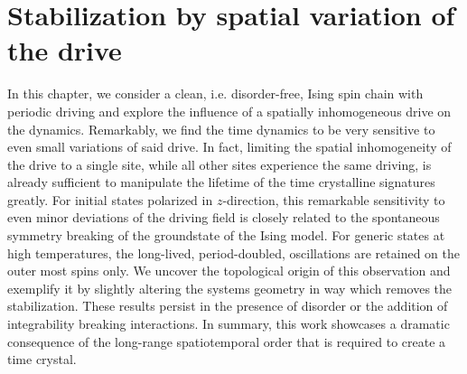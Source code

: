 \chapter{Stabilization by spatial variation of the drive}\label{ch:metronome-spin}

In this chapter, we consider a clean, i.e. disorder-free, Ising spin chain with periodic driving and explore the influence of a spatially inhomogeneous drive on the dynamics. Remarkably, we find the time dynamics to be very sensitive to even small variations of said drive. In fact, limiting the spatial inhomogeneity of the drive to a single site, while all other sites experience the same driving, is already sufficient to manipulate the lifetime of the time crystalline signatures greatly. For initial states polarized in $z$-direction, this remarkable sensitivity to even minor deviations of the driving field is closely related to the spontaneous symmetry breaking of the groundstate of the Ising model.
For generic states at high temperatures, the long-lived, period-doubled, oscillations are retained on the outer most spins only. We uncover the topological origin of this observation and exemplify it by slightly altering the systems geometry in way which removes the stabilization. 
These results persist in the presence of disorder or the addition of integrability breaking interactions. In summary, this work showcases a dramatic consequence of the long-range spatiotemporal order that is required to create a time crystal.

\newpage
{}
